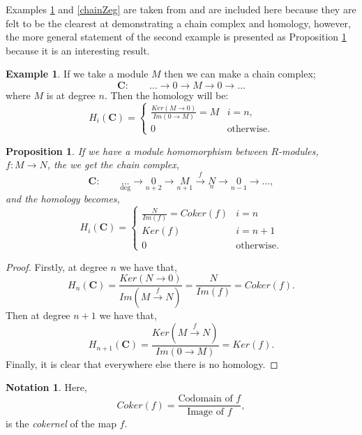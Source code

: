 \documentclass[11.5pt, twoside, a4paper, titlepage]{report}
\providecommand{\equ}[0]{\begin{equation*}}
\providecommand{\eequ}[0] {\end{equation*}}
\theoremstyle{definition}
\newtheorem{note}[mydef]{Notation}
\newtheorem{eg}[mydef]{Example}
\theoremstyle{plain}
\newtheorem{prop}[mydef]{Proposition}
\begin{document}
Examples \ref{chainMeg} and \ref{chainZeg} are taken from \cite{CB1} and are included here because they are felt to be the clearest at demonstrating a chain complex and homology, however, the more general statement of the second example is presented as Proposition \ref{chainhomprop} because it is an interesting result.

\begin{eg}
 \label{chainMeg}
 If we take a module $M$ then we can make a chain complex;
\begin{equation*}
\mathbf{C}: \qquad \dots \xrightarrow{} 0 \xrightarrow{} M \xrightarrow{} 0 \xrightarrow{} \dots
\end{equation*}
where $M$ is at degree $n$. Then the homology will be:
\begin{equation*}
H_i(\mathbf{C})=\begin{cases}
\frac{Ker(M \rightarrow 0)}{Im(0 \rightarrow M)}=M & i=n,\\
0 & \text{otherwise}.
\end{cases}
\end{equation*}
\end{eg}

\begin{prop}  \label{chainhomprop}
If we have a module homomorphism between $R$-modules, $f: M \xrightarrow{} N$, the we get the chain complex,
\equ
\mathbf{C}: \qquad \underset{\text{deg}}{\dots} \xrightarrow{}\underset{n+2}{0} \xrightarrow{} \underset{n+1}{M} \xrightarrow{f}\underset{n}{N} \xrightarrow{} \underset{n-1}{0} \xrightarrow{}\dots ,
\eequ
and the homology becomes,
\equ
H_i(\mathbf{C})=
\begin{cases}
\frac{N}{Im(f)}=Coker(f) & i=n\\
Ker(f) & i=n+1\\
0 & \text{otherwise}.
\end{cases}
\eequ
\end{prop}
\begin{proof}
Firstly, at degree $n$ we have that,
\equ
H_n(\mathbf{C})=\frac{Ker(N\xrightarrow{}0)}{Im(M\xrightarrow{f}N)}=\frac{N}{Im(f)}=Coker(f).
\eequ
Then at degree $n+1$ we have that,
\equ
H_{n+1}(\mathbf{C})=\frac{Ker(M\xrightarrow{f}N)}{Im(0\xrightarrow{}M)}=Ker(f).
\eequ
Finally, it is clear that everywhere else there is no homology.
\end{proof}

\begin{note}
Here, 
\equ
Coker(f)= \frac{\text{Codomain of }f}{\text{Image of }f},
\eequ
is the \emph{cokernel} of the map $f$.
\end{note}
\end{document}
